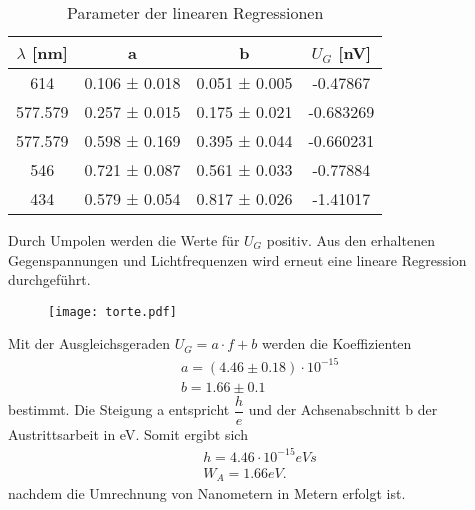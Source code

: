   \begin{table}[H]
    \centering
    \caption{Parameter der linearen Regressionen}
    \label{tab:some}
    \begin{tabular}{c c c c}
     \toprule
      $\lambda$ [nm] & a & b & $U_G$ [nV]\\
      \midrule
      614     & 0.106 ± 0.018&0.051 ± 0.005&-0.47867  \\
      577.579 & 0.257 ± 0.015&0.175 ± 0.021&-0.683269 \\
      577.579 & 0.598 ± 0.169&0.395 ± 0.044&-0.660231 \\
      546     & 0.721 ± 0.087&0.561 ± 0.033&-0.77884  \\
      434     & 0.579 ± 0.054&0.817 ± 0.026&-1.41017  \\
     \bottomrule
    \end{tabular}
  \end{table} 
  Durch Umpolen werden die Werte für $U_G$ positiv.
  Aus den erhaltenen Gegenspannungen und Lichtfrequenzen wird erneut eine lineare 
  Regression durchgeführt.
  \begin{figure}
    \centering
    \texttt{[image: torte.pdf]}
    \caption{}
    \label{fig:torte}
  \end{figure}
  Mit der Ausgleichsgeraden $U_G=a\cdot f +b$ werden die Koeffizienten
  \begin{align*}
    a = (4.46 ± 0.18) \cdot 10^{-15}\\
    b = 1.66 ± 0.1
  \end{align*}
  bestimmt. Die Steigung a entspricht $\dfrac{h}{e}$ und der Achsenabschnitt
  b der Austrittsarbeit in eV. Somit ergibt sich
  \begin{align*}
    h = 4.46 \cdot 10^{-15} eVs\\
    W_A = 1.66 eV.
  \end{align*}
  nachdem die Umrechnung von Nanometern in Metern erfolgt ist.

